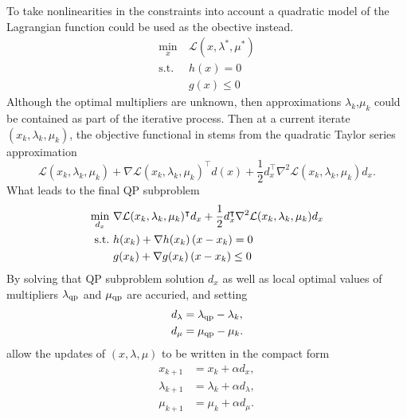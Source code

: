 To take nonlinearities in the constraints into account a quadratic model of the Lagrangian function could be used as the obective instead.
\begin{subequations}
	\begin{align}
	\min_{x}\  & \mathcal{L}(x,\lambda^*,\mu^*)\\
	\text{s.t.}\  &h(x)= 0\\
	&g(x)\leq 0
	\end{align}
\end{subequations}
Although the optimal multipliers are unknown, then approximations $\lambda_k$,$\mu_k$ could be contained as part of the iterative process. Then at a current iterate $(x_k,\lambda_k,\mu_k)$, the objective functional in stems from the quadratic Taylor series approximation
\begin{equation}
	\mathcal{L}(x_k,\lambda_k,\mu_k)+\nabla\mathcal{L}(x_k,\lambda_k,\mu_k)^\intercal d(x)+\frac{1}{2}d_x^\intercal \nabla^2\mathcal{L}(x_k,\lambda_k,\mu_k)d_x.
\end{equation}
What leads to the final QP subproblem
\begin{subequations}
	\begin{align}
	\min_{d_x}\  &\nabla \mathcal{L}(x_k,\lambda_k,\mu_k)^\intercal d_x+\frac{1}{2}d_x^\intercal \nabla^2\mathcal{L}(x_k,\lambda_k,\mu_k)d_x\\
	\text{s.t.}\  &h(x_k)+\nabla h(x_k)\left( x-x_k \right) = 0\\
	&g(x_k)+\nabla g(x_k)\left( x-x_k \right)\leq 0
	\end{align}
\end{subequations}
By solving that QP subproblem solution $d_x$ as well as local optimal values of multipliers $\lambda _{\text{qp}}$ and $\mu _{\text{qp}}$ are accuried, and setting 
\begin{subequations}
	\begin{align}
		d_\lambda &= \lambda _{\text{qp}}-\lambda_k,\\
		d_\mu &= \mu _{\text{qp}}-\mu_k.
	\end{align}
\end{subequations}
allow the updates of $(x,\lambda,\mu)$ to be written in the compact form
\begin{subequations}
	\begin{align}
	x_{k+1} &= x_k + \alpha d_x,\\
	\lambda_{k+1} &= \lambda_k + \alpha d_\lambda,\\
	\mu_{k+1} &= \mu_k + \alpha d_\mu.
	\end{align}
\end{subequations}
